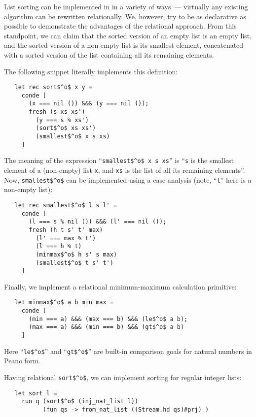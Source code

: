 List sorting can be implemented in \miniKanren in a variety of ways~--- virtually any existing algorithm can
be rewritten relationally. We, however, try to be as declarative as possible to demonstrate the
advantages of the relational approach. From this standpoint, we can claim that the sorted version of an empty list is an
empty list, and the sorted version of a non-empty list is its smallest element, concatenated with a sorted
version of the list containing all its remaining elements.

The following snippet literally implements this definition:

\begin{lstlisting}
   let rec sort$^o$ x y =
     conde [
       (x === nil ()) &&& (y === nil ());
       fresh (s xs xs')
         (y === s % xs')
         (sort$^o$ xs xs')
         (smallest$^o$ x s xs)
     ]
\end{lstlisting}

The meaning of the expression ``\lstinline|smallest$^o$ x s xs|'' is ``\lstinline|s| is the smallest element of a (non-empty) list \lstinline|x|, and \lstinline|xs| is the
list of all its remaining elements''. Now, \lstinline|smallest$^o$| can be implemented using a case analysis (note, ``\lstinline|l|'' here is a non-empty list):

\begin{lstlisting}
   let rec smallest$^o$ l s l' =
     conde [
       (l === s % nil ()) &&& (l' === nil ());
       fresh (h t s' t' max)
         (l' === max % t')
         (l === h % t)
         (minmax$^o$ h s' s max)
         (smallest$^o$ t s' t')
     ]
\end{lstlisting}

Finally, we implement a relational minimum-maximum calculation
primitive:

\begin{lstlisting}
   let minmax$^o$ a b min max =
     conde [
       (min === a) &&& (max === b) &&& (le$^o$ a b);
       (max === a) &&& (min === b) &&& (gt$^o$ a b)
     ]
\end{lstlisting}

Here ``\lstinline|le$^o$|'' and ``\lstinline|gt$^o$|'' are built-in comparison goals for natural numbers in Peano form.

Having relational \lstinline|sort$^o$|, we can implement sorting for regular integer lists:

\begin{lstlisting}
   let sort l =
     run q (sort$^o$ (inj_nat_list l))
           (fun qs -> from_nat_list ((Stream.hd qs)#prj) )
\end{lstlisting}

